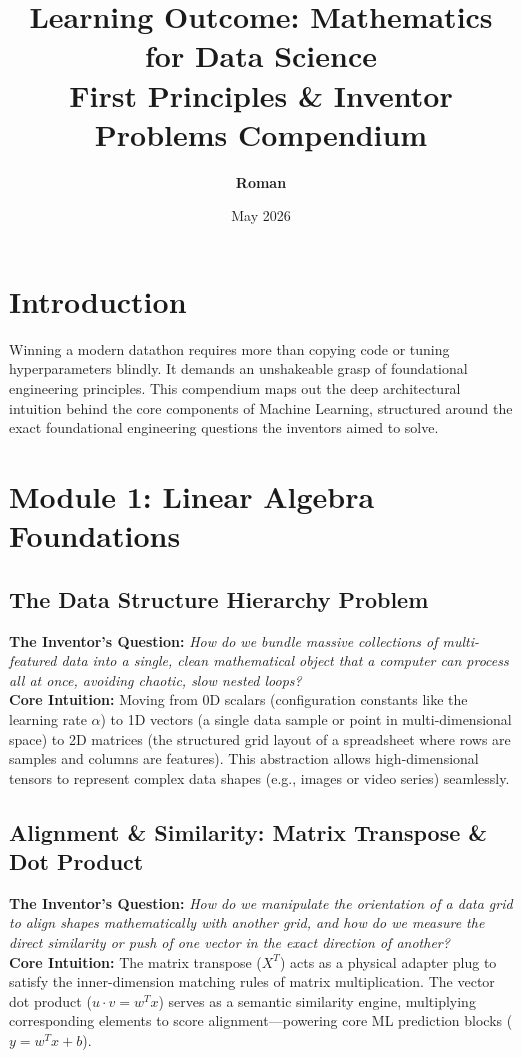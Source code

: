 \documentclass[12pt,a4paper]{article}
\title{\textbf{\color{primary}Learning Outcome: Mathematics for Data Science \\ \large First Principles \& Inventor Problems Compendium}}
\author{\textbf{Roman}}
\date{May 2026}
\begin{document}
\color{darktext}
\maketitle

\section{Introduction}
Winning a modern datathon requires more than copying code or tuning hyperparameters blindly. It demands an unshakeable grasp of foundational engineering principles. This compendium maps out the deep architectural intuition behind the core components of Machine Learning, structured around the exact foundational engineering questions the inventors aimed to solve.

\section{Module 1: Linear Algebra Foundations}
\subsection{The Data Structure Hierarchy Problem}
\textbf{The Inventor's Question:} \textit{How do we bundle massive collections of multi-featured data into a single, clean mathematical object that a computer can process all at once, avoiding chaotic, slow nested loops?} \\
\textbf{Core Intuition:} Moving from 0D scalars (configuration constants like the learning rate $\alpha$) to 1D vectors (a single data sample or point in multi-dimensional space) to 2D matrices (the structured grid layout of a spreadsheet where rows are samples and columns are features). This abstraction allows high-dimensional tensors to represent complex data shapes (e.g., images or video series) seamlessly.

\subsection{Alignment \& Similarity: Matrix Transpose \& Dot Product}
\textbf{The Inventor's Question:} \textit{How do we manipulate the orientation of a data grid to align shapes mathematically with another grid, and how do we measure the direct similarity or push of one vector in the exact direction of another?} \\
\textbf{Core Intuition:} The matrix transpose ($X^T$) acts as a physical adapter plug to satisfy the inner-dimension matching rules of matrix multiplication. The vector dot product ($u \cdot v = w^T x$) serves as a semantic similarity engine, multiplying corresponding elements to score alignment—powering core ML prediction blocks ($y = w^Tx + b$).
\end{document}
